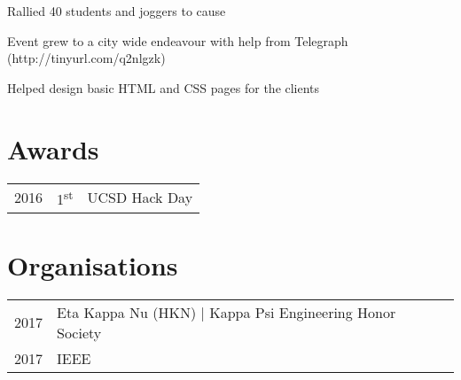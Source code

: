 \documentclass[]{deedy-resume-openfont}
\begin{document}
\begin{minipage}[t]{0.66\textwidth}
\begin{tightemize}
\item Rallied 40 students and joggers to cause
\item Event grew to a city wide endeavour with help from Telegraph (http://tinyurl.com/q2nlgzk)
\end{tightemize}
\sectionsep

\vspace{\topsep} %
\begin{tightemize}
\item Helped design basic HTML and CSS pages for the clients
\end{tightemize}
\sectionsep


\section{Awards} 
\begin{tabular}{rll}
2016	     & 1\textsuperscript{st}  & UCSD Hack Day\\
\end{tabular}
\sectionsep


\section{Organisations}
\begin{tabular}{rll}
2017    & Eta Kappa Nu (HKN) | Kappa Psi Engineering Honor Society\\
2017   & IEEE \\
\end{tabular}
\sectionsep

\end{minipage} 
\end{document}
